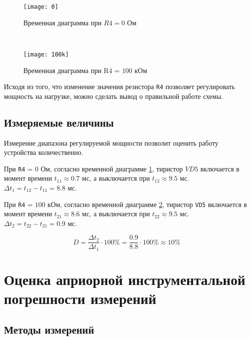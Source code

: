 \begin{figure}[H]
\begin{center}
	\texttt{[image: 0]}
	\caption{Временная диаграмма при $R4 = 0$ Ом}
	\label{pic:diag:0}
\end{center}
\end{figure}

~

\begin{figure}[H]
\begin{center}
	\texttt{[image: 100k]}
	\caption{Временная диаграмма при R4 = $100$ кОм}
	\label{pic:diag:100k}
\end{center}
\end{figure}

Исходя из того, что изменение значения резистора \verb+R4+ позволяет регулировать мощность на нагрузке, можно сделать вывод о правильной работе схемы.

\subsection{Измеряемые величины}

Измерение диапазона регулируемой мощности позволит оценить работу устройства количественно.

При \verb+R4+ = $0$ Ом, согласно временной диаграмме \ref{pic:diag:0}, тиристор $VD5$ включается в момент времени $t_{11} \approx 0.7$ мс, а выключается при $t_{12} \approx 9.5$ мс. $\Delta t_1 = t_{12} - t_{11} = 8.8$ мс.

При \verb+R4+ = $100$ кОм, согласно временной диаграмме \ref{pic:diag:100k}, тиристор \verb+VD5+ включается в момент времени $t_{21} \approx 8.6$ мс, а выключается при $t_{22} \approx 9.5$ мс. $\Delta t_2 = t_{22} - t_{21} = 0.9$ мс.

\begin{displaymath}
	D = \frac{\Delta t_2}{\Delta t_1} \cdot 100\% = \frac{0.9}{8.8} \cdot 100\% \approx 10 \% 
\end{displaymath}

\section{Оценка априорной инструментальной погрешности измерений}

\subsection{Методы измерений}

